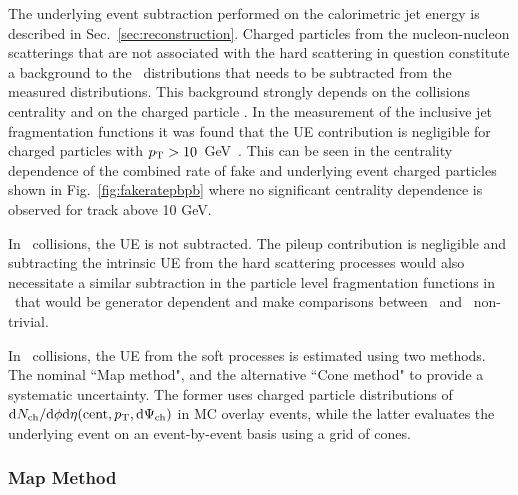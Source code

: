 The underlying event subtraction performed on the calorimetric jet energy is described in Sec.~\ref{sec:reconstruction}. Charged particles from the nucleon-nucleon scatterings that are not associated with the hard scattering in question constitute a background to the \Dptr\ distributions that needs to be subtracted from the measured distributions. This background strongly depends on the collisions centrality and on the charged particle \pt. In the measurement of the inclusive jet fragmentation functions it was found that the UE contribution is negligible for charged particles with $p_{\mathrm{T}}>10$~GeV~\cite{PbPb5TeVIntNote}. This can be seen in the centrality dependence of the combined rate of fake and underlying event charged particles shown in Fig.~\ref{fig:fakeratepbpb} where no significant centrality dependence is observed for track above 10 GeV. 

In \pp\ collisions, the UE is not subtracted. The pileup contribution is negligible and subtracting the intrinsic UE from the hard scattering processes would also necessitate a similar subtraction in the particle level fragmentation functions in \pbpb\ that would be generator dependent and make comparisons between \pp\ and \pbpb\ non-trivial.

In \pbpb\ collisions, the UE from the soft processes is estimated using two methods. The nominal ``Map method", and the alternative ``Cone method" to provide a systematic uncertainty. The former uses charged particle distributions of $\mathrm{d}N_{\mathrm{ch}}/\mathrm{d}\phi\mathrm{d}\eta(\mathrm{cent},\pt, \mathrm{d}\Psi_{\mathrm{ch}})$ in MC overlay events, while the latter evaluates the underlying event on an event-by-event basis using a grid of cones. 

\subsubsection{Map Method}
\label{sec:map_method}


